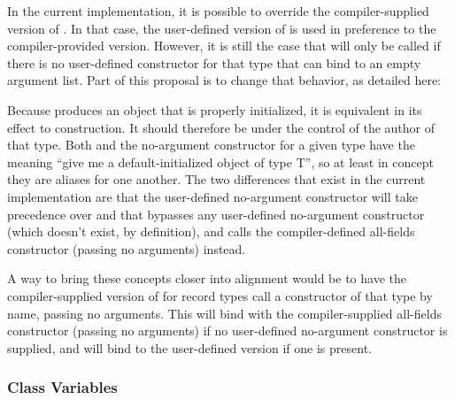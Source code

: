 In the current implementation, it is possible to override the compiler-supplied version of
.  In that case, the user-defined version of  is
used in preference to the compiler-provided version.
However, it is still the case that  will only be called if there is no
user-defined constructor for that type that can bind to an empty argument list.
Part of this proposal is to change that behavior, as detailed here:

Because  produces an object that is properly initialized, it is
equivalent in its effect to construction.  It should therefore be under the control of the
author of that type.  Both  and the no-argument constructor for a given
type have the meaning ``give me a default-initialized object of type T'', so at least in
concept they are aliases for one another.  The two differences that exist in the current
implementation are that the user-defined no-argument constructor will take precedence over
 and that  bypasses any user-defined no-argument
constructor (which doesn't exist, by definition), and calls the compiler-defined
all-fields constructor (passing no arguments) instead.  

A way to bring these concepts
closer into alignment would be to have the compiler-supplied version of
 for record types call a constructor of that type by name, passing no
arguments.  This will bind with the compiler-supplied all-fields constructor (passing no
arguments) if no user-defined no-argument constructor is supplied, and will bind to the
user-defined version if one is present.

\subsubsection{Class Variables}

